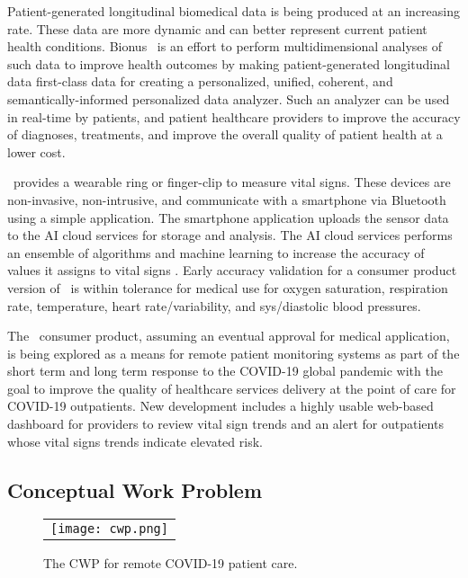 Patient-generated longitudinal biomedical data is being produced at an increasing rate. These data are more dynamic and can better represent current patient health conditions. Bionus \phware\ is an effort to perform multidimensional analyses of such data to improve health outcomes by making patient-generated longitudinal data first-class data for creating a personalized, unified, coherent, and semantically-informed personalized data analyzer. Such an analyzer can be used in real-time by patients, and patient healthcare providers to improve the accuracy of diagnoses, treatments, and improve the overall quality of patient health at a lower cost.

\phware\ provides a wearable ring or finger-clip to measure vital signs. These devices are non-invasive, non-intrusive, and  communicate with a smartphone via Bluetooth using a simple application. The smartphone application uploads the sensor data to the AI cloud services for storage and analysis. The AI cloud services performs an ensemble of algorithms and machine learning to increase the accuracy of values it assigns to vital signs \cite{Altschul2004PredictiveMI,10.2307/2984877,10.5555/1643031.1643047}. Early accuracy validation for a consumer product version of \phware\ is within tolerance for medical use for oxygen saturation, respiration rate, temperature, heart rate/variability, and sys/diastolic blood pressures.

The \phware\ consumer product, assuming an eventual approval for medical application, is being explored as a means for remote patient monitoring systems as part of the short term and long term response to the COVID-19 global pandemic with the goal to improve the quality of healthcare services delivery at the point of care for COVID-19 outpatients. New development includes a highly usable web-based dashboard for providers to review vital sign trends and an alert for outpatients whose vital signs trends indicate elevated risk. 

\subsection{Conceptual Work Problem}
\begin{figure*}
  \begin{center}
    \begin{tabular}{c}
      \texttt{[image: cwp.png]}
    \end{tabular}
  \end{center}
\caption{The CWP for remote COVID-19 patient care.}
\label{fig:cwp}
\end{figure*}

